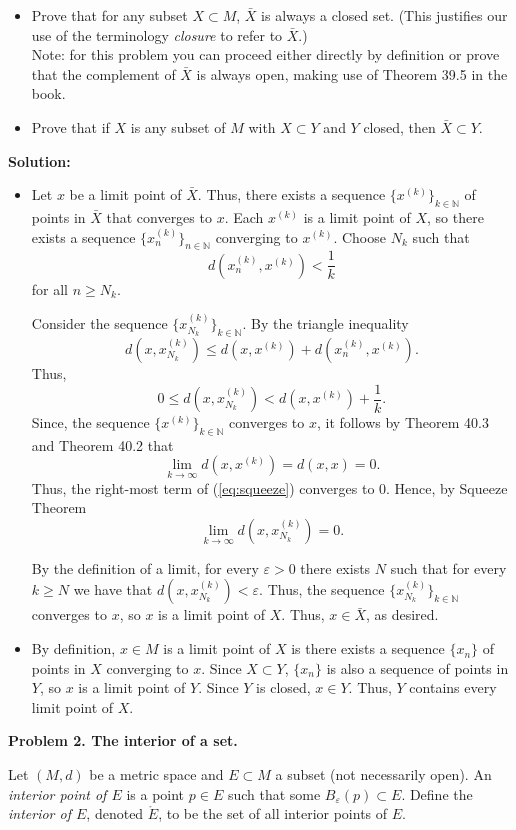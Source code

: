 \documentclass[12pt]{article}
\def\black{\color{black}}
\def\green{\color{rltgreen}}
\newcommand\bi{\begin{itemize}}
\newcommand\ei{\end{itemize}}
\newcommand\beq{\begin{equation}}
\newcommand\eeq{\end{equation}}
\newcommand\itema{\item[(a)]}
\newcommand\itemb{\item[(b)]}
\renewcommand\|{\ | \ }
\newcommand\ra{\rightarrow}
\newcommand\N{\mathbb{N}}
\def\pb#1{{\green \bf Problem #1.}\hskip 8pt \black}
\def\sol{\textbf{Solution:}}
\def\sequence#1{$\{{#1}_n\}$}
\newcommand\e\varepsilon
\begin{document}
\bi
\itema
Prove that for any subset $X \subset M$, $\bar X$ is always a closed set. 
(This justifies our use of the terminology \emph{closure} to refer to
$\bar X$.) \\
Note: for this problem you can proceed either directly by definition or
prove that the complement of $\bar X$ is always open, making use of
Theorem 39.5 in the book.
\itemb
Prove that if $X$ is any subset of $M$ with $X \subset Y$ and $Y$ closed,
then $\bar X \subset Y$.
\ei

\sol

\bi
\itema
Let $x$ be a limit point of $\bar X$. Thus, there exists a sequence
$\{x^{(k)}\}_{k \in \N}$ of points in $\bar X$ that converges to $x$. Each
$x^{(k)}$ is a limit point of $X$, so there exists a sequence
$\{x^{(k)}_n\}_{n \in \N}$ converging to $x^{(k)}$. Choose $N_k$ such that
\[
d(x^{(k)}_n, x^{(k)}) < \frac 1 k
\]
for all $n \geq N_k$. 

Consider the sequence $\{x_{N_k}^{(k)}\}_{k \in \N}$. By the triangle
inequality
\[
d(x, x_{N_k}^{(k)}) \leq d(x, x^{(k)}) + d(x^{(k)}_n, x^{(k)}).
\]
Thus, 
\beq
\label{eq:squeeze}
0 \leq d(x, x_{N_k}^{(k)}) < d(x, x^{(k)}) + \frac 1 k.
\eeq
Since, the sequence $\{x^{(k)}\}_{k \in \N}$ converges to $x$, it follows by
Theorem 40.3 and Theorem 40.2 that 
\[\lim_{k \ra \infty} d(x, x^{(k)}) = d(x, x) = 0.
\]
Thus, the right-most term of (\ref{eq:squeeze}) converges to 0. Hence,
by Squeeze Theorem 
\[
\lim_{k \ra \infty} d(x, x_{N_k}^{(k)}) = 0.
\]

By the definition of a limit, for every $\e > 0$ there exists $N$ such that
for every $k \geq N$ we have that $d(x, x_{N_k}^{(k)}) < \e$. Thus, 
the sequence $\{x_{N_k}^{(k)}\}_{k \in \N}$ converges to $x$, so $x$ is 
a limit point of $X$. Thus, $x \in \bar X$, as desired.

\itemb
By definition, $x \in M$ is a limit point of $X$ is there exists a sequence
\sequence x of points in $X$ converging to $x$. Since $X \subset Y$, 
\sequence x is also a sequence of points in $Y$, so $x$ is a limit point of 
$Y$. Since $Y$ is closed, $x \in Y$. Thus, $Y$ contains every limit point of
$X$.
\ei




\pb{2. The interior of a set}

Let $(M, d)$ be a metric space and $E \subset M$ a subset (not necessarily
open). An \emph{interior point of $E$} is a point $p \in E$ such that 
some $B_{\e}(p) \subset E$. Define the \emph{interior of $E$}, denoted
$\mathring E$, to be the set of all interior points of $E$.
\end{document}
